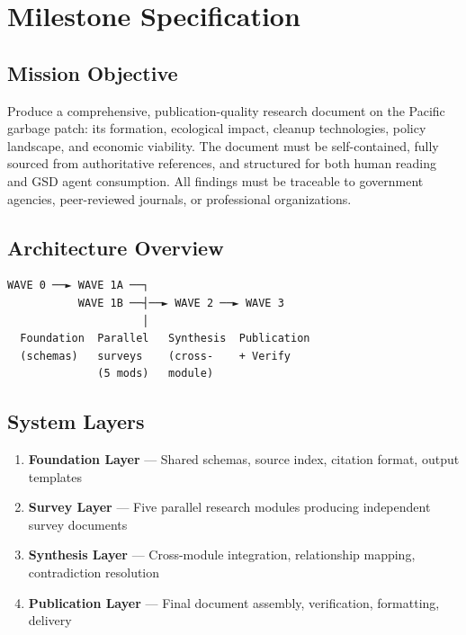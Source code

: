 \documentclass[11pt,letterpaper]{article}
\newcommand{\stageheader}[2]{%
  \noindent\colorbox{#2}{\makebox[\textwidth][l]{%
    \textcolor{white}{\bfseries\sffamily\hspace{6pt}#1\hspace{6pt}}}}%
  \vspace{0.5em}\par%
}
\begin{document}
\newpage

\stageheader{STAGE 3 --- MISSION PACKAGE}{tertiary}

\section{Milestone Specification}

\subsection{Mission Objective}

Produce a comprehensive, publication-quality research document on the Pacific garbage patch: its formation, ecological impact, cleanup technologies, policy landscape, and economic viability. The document must be self-contained, fully sourced from authoritative references, and structured for both human reading and GSD agent consumption. All findings must be traceable to government agencies, peer-reviewed journals, or professional organizations.

\subsection{Architecture Overview}

\begin{asciibox}
\begin{verbatim}
WAVE 0 ──► WAVE 1A ──┐
           WAVE 1B ──┤──► WAVE 2 ──► WAVE 3
                     │
  Foundation  Parallel   Synthesis  Publication
  (schemas)   surveys    (cross-    + Verify
              (5 mods)   module)
\end{verbatim}
\end{asciibox}

\subsection{System Layers}

\begin{enumerate}[leftmargin=2em]
\item \textbf{Foundation Layer} --- Shared schemas, source index, citation format, output templates
\item \textbf{Survey Layer} --- Five parallel research modules producing independent survey documents
\item \textbf{Synthesis Layer} --- Cross-module integration, relationship mapping, contradiction resolution
\item \textbf{Publication Layer} --- Final document assembly, verification, formatting, delivery
\end{enumerate}
\end{document}
